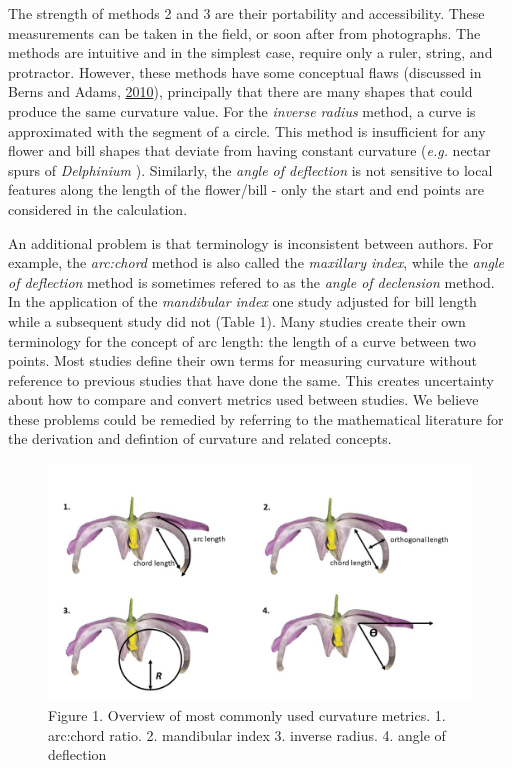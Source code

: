 \documentclass[]{article}
\begin{document}
The strength of methods 2 and 3 are their portability and accessibility.
These measurements can be taken in the field, or soon after from
photographs. The methods are intuitive and in the simplest case, require
only a ruler, string, and protractor. However, these methods have some
conceptual flaws (discussed in Berns and Adams,
\protect\hyperlink{ref-berns_2010}{2010}), principally that there are
many shapes that could produce the same curvature value. For the
\emph{inverse radius} method, a curve is approximated with the segment
of a circle. This method is insufficient for any flower and bill shapes
that deviate from having constant curvature (\emph{e.g.} nectar spurs of
\emph{Delphinium} ). Similarly, the \emph{angle of deflection} is not
sensitive to local features along the length of the flower/bill - only
the start and end points are considered in the calculation.

An additional problem is that terminology is inconsistent between
authors. For example, the \emph{arc:chord} method is also called the
\emph{maxillary index}, while the \emph{angle of deflection} method is
sometimes refered to as the \emph{angle of declension} method. In the
application of the \emph{mandibular index} one study adjusted for bill
length while a subsequent study did not (Table 1). Many studies create
their own terminology for the concept of arc length: the length of a
curve between two points. Most studies define their own terms for
measuring curvature without reference to previous studies that have done
the same. This creates uncertainty about how to compare and convert
metrics used between studies. We believe these problems could be
remedied by referring to the mathematical literature for the derivation
and defintion of curvature and related concepts.

\begin{figure}
\centering
\includegraphics{Figures/Figure_1.jpg}
\caption{Figure 1. Overview of most commonly used curvature metrics. 1.
arc:chord ratio. 2. mandibular index 3. inverse radius. 4. angle of
deflection}
\end{figure}
\end{document}
